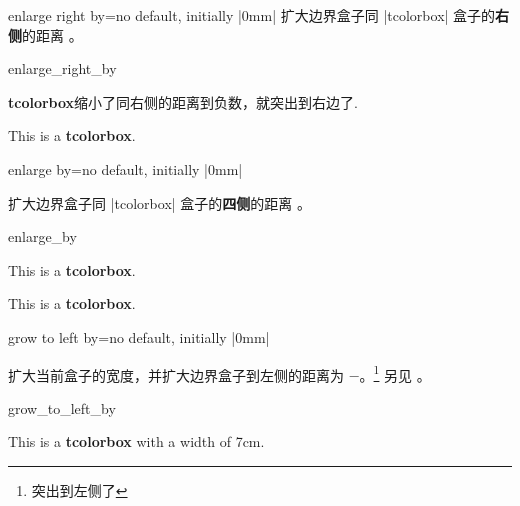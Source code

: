 \begin{docTcbKey}{enlarge right by}{=}{no default, initially |0mm|}
  扩大边界盒子同 |tcolorbox| 盒子的{\bf 右侧}的距离 。
\begin{exdispExample}[safety=2cm]{enlarge_right_by}

\begin{tcolorbox}[enlarge right by=-2cm,width=\linewidth+2cm,
  enhanced,show bounding box]
\textbf{tcolorbox}缩小了同右侧的距离到负数，就突出到右边了.
\end{tcolorbox}
\begin{tcolorbox}[enlarge right by=2cm,width=\linewidth-2cm]
This is a \textbf{tcolorbox}.
\end{tcolorbox}
\end{exdispExample}
\end{docTcbKey}




\begin{docTcbKey}{enlarge by}{=}{no default, initially |0mm|}

  扩大边界盒子同 |tcolorbox| 盒子的{\bf 四侧}的距离 。
\begin{exdispExample}{enlarge_by}

\begin{tcolorbox}
This is a \textbf{tcolorbox}.
\end{tcolorbox}
\begin{tcolorbox}[enlarge by=5mm,enhanced,show bounding box]
This is a \textbf{tcolorbox}.
\end{tcolorbox}
\end{exdispExample}
\end{docTcbKey}





\begin{docTcbKey}{grow to left by}{=}{no default, initially |0mm|}

扩大当前盒子的宽度，并扩大边界盒子到左侧的距离为
  $-$。\footnote{突出到左侧了} 另见 。
\begin{exdispExample}[safety=2cm]{grow_to_left_by}

\begin{tcolorbox}[width=5cm,grow to left by=2cm,enhanced,show bounding box]
This is a \textbf{tcolorbox} with a width of 7cm.
\end{tcolorbox}
\end{exdispExample}
\end{docTcbKey}

